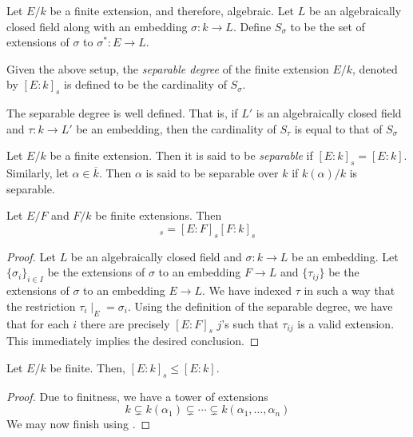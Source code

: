 Let $E/k$ be a finite extension, and therefore, algebraic. Let $L$ be an algebraically closed field along with an embedding $\sigma: k\to L$. Define $S_\sigma$ to be the set of extensions of $\sigma$ to $\sigma^*: E\to L$.

\begin{definition}
    Given the above setup, the \textit{separable degree} of the finite extension $E/k$, denoted by $[E:k]_s$ is defined to be the cardinality of $S_\sigma$.
\end{definition}

\begin{proposition} 
    The separable degree is well defined. That is, if $L'$ is an algebraically closed field and $\tau: k\to L'$ be an embedding, then the cardinality of $S_\tau$ is equal to that of $S_\sigma$
\end{proposition}

\begin{definition}
    Let $E/k$ be a finite extension. Then it is said to be \textit{separable} if $[E:k]_s = [E:k]$. Similarly, let $\alpha\in\overline{k}$. Then $\alpha$ is said to be separable over $k$ if $k(\alpha)/k$ is separable.
\end{definition}

\begin{proposition}
    Let $E/F$ and $F/k$ be finite extensions. Then 
    \begin{equation*}
        [E:k]_s = [E:F]_s[F:k]_s
    \end{equation*}
\end{proposition}
\begin{proof}
    Let $L$ be an algebraically closed field and $\sigma: k\to L$ be an embedding. Let $\{\sigma_i\}_{i\in I}$ be the extensions of $\sigma$ to an embedding $F\to L$ and $\{\tau_{ij}\}$ be the extensions of $\sigma$ to an embedding $E\to L$. We have indexed $\tau$ in such a way that the restriction $\tau_i\mid_{E} = \sigma_i$. Using the definition of the separable degree, we have that for each $i$ there are precisely $[E:F]_s$ $j$'s such that $\tau_{ij}$ is a valid extension. This immediately implies the desired conclusion.
\end{proof}

\begin{corollary}
    Let $E/k$ be finite. Then, $[E:k]_s\le [E:k]$.
\end{corollary}
\begin{proof}
    Due to finitness, we have a tower of extensions 
    \begin{equation*}
        k\subsetneq k(\alpha_1)\subsetneq\cdots\subsetneq k(\alpha_1,\ldots,\alpha_n)
    \end{equation*}
    We may now finish using .
\end{proof}

